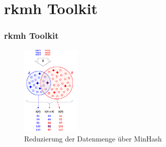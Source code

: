 \section{rkmh Toolkit}

\begin{frame}
    \frametitle{rkmh Toolkit}


    \begin{figure}[H]
        \centering
        \includegraphics[width=0.25\textwidth]{images/mash_similarity.png} 
        \caption{Reduzierung der Datenmenge über MinHash \cite{mashSimilarityImage}}
    \end{figure}
\end{frame}